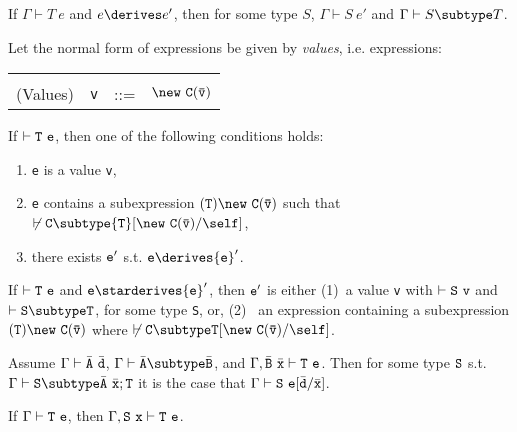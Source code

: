 \begin{theorem} 

If $\Gamma \vdash T\ e$ and $e \derives e'$, then for some type $S$,
$\Gamma \vdash S\ e'$ and $\Gamma \vdash S \subtype T$.

\end{theorem}

Let the normal form of expressions be given by {\em values},
i.e.{} expressions:

\begin{tabular}{rrcl}
&&&\\
(Values) & {\tt v} &{::=}& $\new\ {\tt C(\bar{\tt v})}$
\end{tabular}

\begin{theorem}[Progress] If $\vdash {\tt T\ e}$, then one of the following conditions holds:
\begin{enumerate}
\item {\tt e} is a value {\tt v}, 
\item {\tt e} contains a subexpression ${\tt (T)\new\ C(\bar{\tt
v})}$ such that
$\not\vdash {\tt C} \subtype {\tt T}[{\tt \new\ C(\bar{\tt v})}/\self]$,
\item there exists ${\tt e}'$ s.t. ${\tt e} \derives {\tt e}'$.
\end{enumerate}
\end{theorem}

\begin{theorem} 

If $\vdash {\tt T\ e}$ and ${\tt e} \starderives {\tt e}'$, then ${\tt e}'$ is
either (1)~a value {\tt v} with $\vdash {\tt S\ v}$ and $\vdash {\tt S
\subtype T}$, for some type {\tt S}, or, (2)~ an expression containing
a subexpression ${\tt (T)\new\ {\tt C(\bar{\tt v})}}$ where 
$\not\vdash \tt C\subtype T[\new\ C(\bar{\tt v})/\self]$.

\end{theorem}

\begin{lemma}
Assume $\Gamma \vdash \bar{\tt A}\ \bar{\tt d}$, $\Gamma \vdash \bar{\tt A}\subtype \bar{\tt B}$, and $\Gamma, \bar{\tt B}\ \bar{\tt x} \vdash {\tt T}\ {\tt e}$. Then for some type ${\tt S}$ s.t. $\Gamma \vdash {\tt S} \subtype \bar{\tt A}\ \bar{\tt x};{\tt T}$ it is the case that $\Gamma \vdash {\tt S}\ {\tt e}[\bar{\tt d}/\bar{\tt x}]$.
\end{lemma}

\begin{lemma}[Weakening]
If $\Gamma \vdash {\tt T}\ {\tt e}$, then $\Gamma, {\tt S}\ {\tt x}\vdash {\tt T}\ {\tt e}$.
\end{lemma}

